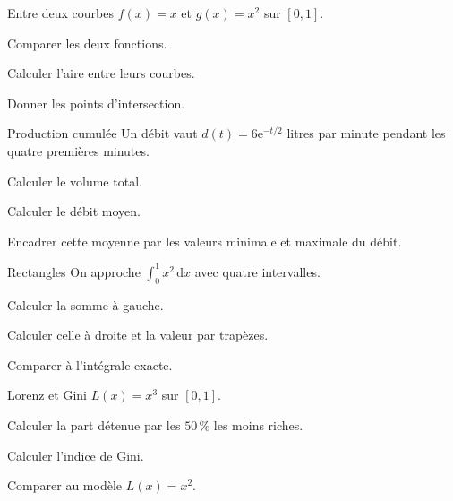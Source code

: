 \begingroup\renewcommand{\otBesoinPlace}[1]{}\begin{minipage}{\linewidth}
\begin{exercice}[2]{Entre deux courbes}
$f(x)=x$ et $g(x)=x^2$ sur $[0,1]$.
\begin{questions}
\item Comparer les deux fonctions.
\item Calculer l’aire entre leurs courbes.
\item Donner les points d’intersection.
\end{questions}
\end{exercice}
\begin{exercice}[2]{Production cumulée}
Un débit vaut $d(t)=6\mathrm e^{-t/2}$ litres par minute pendant les quatre premières minutes.
\begin{questions}
\item Calculer le volume total.
\item Calculer le débit moyen.
\item Encadrer cette moyenne par les valeurs minimale et maximale du débit.
\end{questions}
\end{exercice}
\begin{exercice}[2]{Rectangles}
On approche $\int_0^1x^2\,\mathrm dx$ avec quatre intervalles.
\begin{questions}
\item Calculer la somme à gauche.
\item Calculer celle à droite et la valeur par trapèzes.
\item Comparer à l’intégrale exacte.
\end{questions}
\end{exercice}
\begin{exercice}[2]{Lorenz et Gini}
$L(x)=x^3$ sur $[0,1]$.
\begin{questions}
\item Calculer la part détenue par les $50\,\%$ les moins riches.
\item Calculer l’indice de Gini.
\item Comparer au modèle $L(x)=x^2$.
\end{questions}
\end{exercice}
\end{minipage}\endgroup
\clearpage
{}
